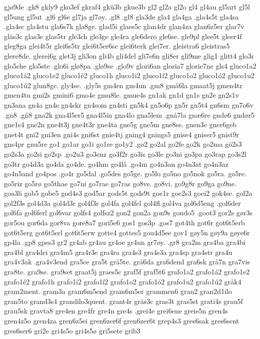 gjø9de
.gk8
gkly9
gko3ef
gkraf4
gkü3b
gkue3b
gl2
gl2a
gl2o
gl4
gl4au
gl5art
gl5l
gl5ung
gl5ut
.gl6
gl6e
gl7ja
gl7øy.
.gl8
.gł8
gla3de
gla4
gla4ga
.gla4s5t
gla4sa
.gla4sc
gla4stu
gla6s7k
gla8ge.
glad5i
glaes5c
glan4dr
glan4za
glan6z5er
glar7v
gläs3c
glas3e
glas5tr
gle3ch
gle3ge
gle4ra
gle6dero
gle6se.
gle9pl
glee5t
gleer4f
gleg8ga
glei4t5r
glei6s5tr
glei6t5er6sc
glei6terk
glei7er.
gleistra6
gleistras5
glere8de.
glerei6g
glet3j
gli3on
gli4b
gli4del
gli7e6n
gli8er
gli9me
glig1
glitt4
glo3r
glo5che
glo5ste
.glo6i
glø8pa
.glø9se
.glo9v
glori6an
gloria7
glorie7ne
gls4
gluco1a2
gluco1á2
gluco1e2
gluco1é2
gluco1h
gluco1i2
gluco1í2
gluco1o2
gluco1ó2
gluco1u2
gluco1ú2
glun8ge.
gly4se.
.gly5s
gm4en
gm4un
.gm8
gmå6la
gmaat5j
gmen4tr
gmen4tu
gmi2s
gmini6
gmo4e
gmu8le.
gmue4s
gn1ak
gn1d
gn1s
gn2e
gn2s1v
gn3ana
gn4a
gn4e
gn4skr
gn4som
gn4sti
gn5k4
gn5o6p
gn5r
gn5t4
gn6sm
gn7o6v
.gn8
.gń8
gna2k
gna4l5er5
gna4l5in
gna4lo
gna5lem
.gnå7la
gnæ6re
gndø6
gndør5
gne1s4
gne2n
gne4t3j
gne4t3r
gne4ta
gne5g
gne5m
gne8se.
gnen3e
gner6geb
gnet4t
gni2
gni3en
gni4s
gni6st
gnie4tj
gning4
gnings5
gnise4
gniser5
gnist9r
gns4pr
gnu5re
go1
go1ar
go1i
go1re
go1y2
.gø2
go2al
go2fe
go2k
go2ma
gö2s3
go2s3a
go2si
go2sp
.go2u3
go3enz
go3f2r
go3is
go3le
go3ni
go3pa
go3rap
go3s2l
go3tr
go4d3a
go4da
go4de.
go4hm
go4lå
.go4m
go4n3an
go4n3at
go4n3az
go4n5and
go4pos
.go4r
go5dal
.go5des
go5ge.
go5lo
go5no
go5nok
go5ra.
go5re.
go5riz
go5rø
go5thae
go7ni
go7rae
go7ras
go8ve.
go8vi.
go9g8r
go9ga
go9ne.
goa3li
gob5
gobe5
god4s3
god5ar
gods5t
gods9t
goe1r
goe2s3
goei2
gok4se.
gol2a
gol2f3s
gol4d3a
gol4d3r
gol4f3r
gol4fa
gol4fel
gol4fl
gol4va
gol6d5eng
.gol6der
gol6fa
gol6ferl
gol6var
golfs4
golfsz2
gon2
gon2a
gon9s
gondo5
.goot3
gor2s
gør3s
gor5ou
gor6da
gor8va
gore8a7
gori5e6
gos1
gos3p
.gos7
got4th
got6r
got6t5erb
got6t5erg
got6t5erl
got6t5erw
gotte4
gottes5
gou4d5ee
gov1
gøy5n
gøy9a
gøye6r
gp4la
.gp8
gpes3
gr2
gr4ab
gr4au
gr4oe
gr4un
gr7øy.
.gr8
gra2m
gra4ba
gra4bi
gra4bl
gra4dei
gra4m5
gra4r3e
gra4ra
gra4s3
gra4s3a
gra4sp
gra4str
gra4u
gra4v3ak
.gra4v3end
gra5ce
gra5t
grå5te.
grå6da
gra6dend
gra6sk
grå7n
gra7vis
gra8te.
gra9se.
gra9set
graat5j
graes5c
graf5f
graf5t6
grafo1a2
grafo1á2
grafo1e2
grafo1é2
grafo1h
grafo1i2
grafo1í2
grafo1o2
grafo1ó2
grafo1u2
grafo1ú2
gråk4
gram2ment.
gram3a
gram6m5end
gram6m5er
grammen6
gran2
gran2d1ilo
gran5to
grand3s4
grandilo3quent.
grant4r
gräs3c
gras3t
gras5st
grati4s
grau5f
grau5sk
gravta8
gre4en
gre4fr
gre4n
gre4s
.grei4e
grei6ene
greie5n
gren4s
gren4z5o
gren4za
gren6z5ei
gren6zer6f
gren6zer6t
grep4s3
gres6sak
gres6sent
gres6ser6
gri2e
gri4s5o
gri4s5ø
gri5sete
grib3
